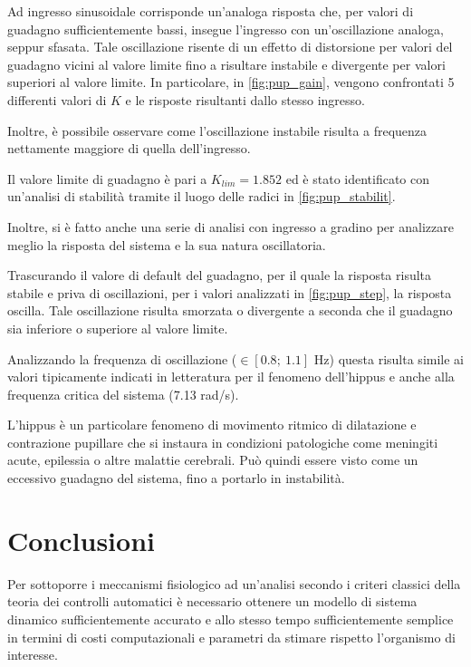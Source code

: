 Ad ingresso sinusoidale corrisponde un'analoga risposta che, per valori di guadagno sufficientemente bassi, insegue l'ingresso con un'oscillazione analoga, seppur sfasata.
Tale oscillazione risente di un effetto di distorsione per valori del guadagno vicini al valore limite fino a risultare instabile e divergente per valori superiori al valore limite. In particolare, in \cref{fig:pup_gain}, vengono confrontati 5 differenti valori di $K$ e le risposte risultanti dallo stesso ingresso. 

Inoltre, è possibile osservare come l'oscillazione instabile risulta a frequenza nettamente maggiore di quella dell'ingresso. 

Il valore limite di guadagno è pari a $K_{lim}=1.852$ ed è stato identificato con un'analisi di stabilità tramite il luogo delle radici in \cref{fig:pup_stabilit}.

Inoltre, si è fatto anche una serie di analisi con ingresso a gradino per analizzare meglio la risposta del sistema e la sua natura oscillatoria. 

Trascurando il valore di default del guadagno, per il quale la risposta risulta stabile e priva di oscillazioni, per i valori analizzati in \cref{fig:pup_step}, la risposta oscilla. Tale oscillazione risulta smorzata o divergente a seconda che il guadagno sia inferiore o superiore al valore limite.

Analizzando la frequenza di oscillazione ($\in [0.8;\:1.1]$ Hz) questa risulta simile ai valori tipicamente indicati in letteratura per il fenomeno dell'hippus \cite{turnbull_origins_2017} e anche alla frequenza critica del sistema (7.13 rad/s).

L'hippus è un particolare fenomeno di movimento ritmico di dilatazione e contrazione pupillare che si instaura in condizioni patologiche come meningiti acute, epilessia o altre malattie cerebrali. Può quindi essere visto come un eccessivo guadagno del sistema, fino a portarlo in instabilità. 



\section{Conclusioni}

Per sottoporre i meccanismi fisiologico ad un'analisi secondo i criteri classici della teoria dei controlli automatici è necessario ottenere un modello di sistema dinamico sufficientemente accurato e allo stesso tempo sufficientemente semplice in termini di costi computazionali e parametri da stimare rispetto l'organismo di interesse.

